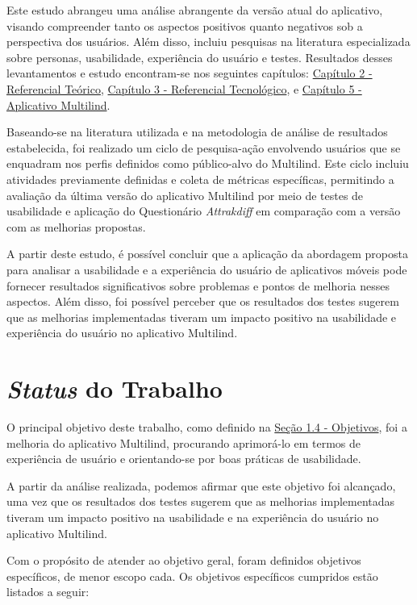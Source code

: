 Este estudo abrangeu uma análise abrangente da versão atual do aplicativo, visando compreender tanto os aspectos positivos quanto negativos sob a perspectiva dos usuários. 
Além disso, incluiu pesquisas na literatura especializada sobre personas, usabilidade, experiência do usuário e testes.  Resultados desses levantamentos e estudo encontram-se 
nos seguintes capítulos: \hyperref[chap:Referencial]{Capítulo 2 - Referencial Teórico}, \hyperref[chap:ReferencialTech]{Capítulo 3 - Referencial Tecnológico}, e 
\hyperref[chap:Aplicativo Multilind]{Capítulo 5 - Aplicativo Multilind}.

Baseando-se na literatura utilizada e na metodologia de análise de resultados estabelecida, foi realizado um ciclo de pesquisa-ação envolvendo usuários que se enquadram nos 
perfis definidos como público-alvo do Multilind. Este ciclo incluiu atividades previamente definidas e coleta de métricas específicas, permitindo a avaliação da última versão 
do aplicativo Multilind por meio de testes de usabilidade e aplicação do Questionário \textit{Attrakdiff} em comparação com a versão com as melhorias propostas.

A partir deste estudo, é possível concluir que a aplicação da abordagem proposta para analisar a usabilidade e a experiência do usuário de aplicativos móveis pode fornecer 
resultados significativos sobre problemas e pontos de melhoria nesses aspectos. Além disso, foi possível perceber que os resultados dos testes sugerem que as melhorias 
implementadas tiveram um impacto positivo na usabilidade e experiência do usuário no aplicativo Multilind.

\section{\textit{Status} do Trabalho}
\label{sec:Status do Trabalho}
O principal objetivo deste trabalho, como definido na \hyperref[sec:Objetivos]{Seção 1.4 - Objetivos}, foi a melhoria do aplicativo Multilind, procurando aprimorá-lo em termos 
de experiência de usuário e orientando-se por boas práticas de usabilidade.

A partir da análise realizada, podemos afirmar que este objetivo foi alcançado, uma vez que os resultados dos testes sugerem que as melhorias implementadas tiveram um impacto 
positivo na usabilidade e na experiência do usuário no aplicativo Multilind.

Com o propósito de atender ao objetivo geral, foram definidos objetivos específicos, de menor escopo cada. Os objetivos específicos cumpridos estão listados a
seguir:


